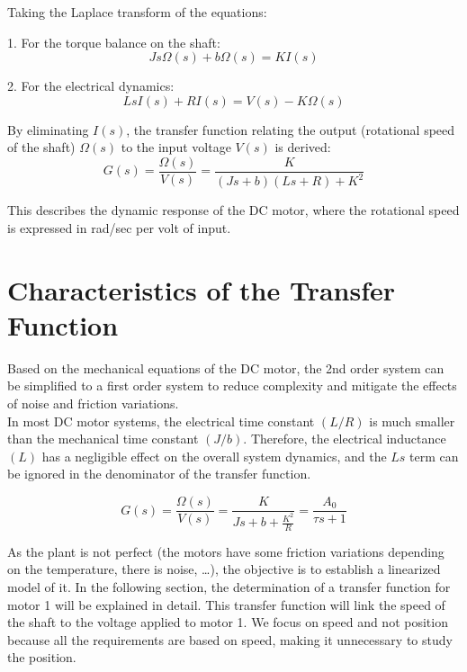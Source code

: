 Taking the Laplace transform of the equations:

1. For the torque balance on the shaft:
\begin{equation}
    J s \Omega(s) + b \Omega(s) = K I(s)
    \label{eq:shaft_eq_final_laplace}
\end{equation}

2. For the electrical dynamics:
\begin{equation}
    L s I(s) + R I(s) = V(s) - K \Omega(s)
    \label{eq:Kirchhoff_eq_final_laplace}
\end{equation}

By eliminating \( I(s) \), the transfer function relating the output (rotational speed of the shaft) \( \Omega(s) \) to the input voltage \( V(s) \) is derived:
\begin{equation}
    G(s) = \frac{\Omega(s)}{V(s)} = \frac{K}{(J s + b)(L s + R) + K^2}
    \label{eq:2nd_st_order_TF}
\end{equation}

This describes the dynamic response of the DC motor, where the rotational speed is expressed in rad/sec per volt of input.

\section{Characteristics of the Transfer Function}
Based on the mechanical equations of the DC motor, the 2nd order system can be simplified to a first order system to reduce complexity and mitigate the effects of noise and friction variations.\\

In most DC motor systems, the electrical time constant $(L/R)$ is much smaller than the mechanical time constant $(J/b)$. Therefore, the electrical inductance $(L)$ has a negligible effect on the overall system dynamics, and the $Ls$ term can be ignored in the denominator of the transfer function.

\begin{equation}
    G(s) = \frac{\Omega(s)}{V(s)} = \frac{K}{J s + b + \frac{K^2}{R}} = \frac{A_0}{\tau s + 1}
    \label{eq:2nd_to_1st_order_TF}
\end{equation}

As the plant is not perfect (the motors have some friction variations depending on the temperature, there is noise, \dots), the objective is to establish a linearized model of it. 
In the following section, the determination of a transfer function for motor 1 will be explained in detail. 
This transfer function will link the speed of the shaft to the voltage applied to motor 1. 
We focus on speed and not position because all the requirements are based on speed, making it unnecessary to study the position.\\

